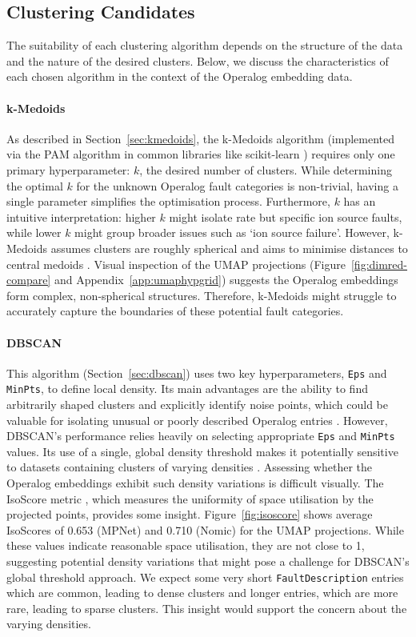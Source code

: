 \documentclass[10pt,oneside]{report}
\begin{document}
\subsection{Clustering Candidates}

The suitability of each clustering algorithm depends on the structure of the data and the nature of the desired clusters. Below, we discuss the characteristics of each chosen algorithm in the context of the Operalog embedding data.

\paragraph{k-Medoids} As described in Section~\ref{sec:kmedoids}, the k-Medoids algorithm (implemented via the PAM algorithm in common libraries like scikit-learn \cite{scikit-learn}) requires only one primary hyperparameter: $k$, the desired number of clusters. While determining the optimal $k$ for the unknown Operalog fault categories is non-trivial, having a single parameter simplifies the optimisation process. Furthermore, $k$ has an intuitive interpretation:  higher $k$ might isolate rate but specific ion source faults, while lower $k$ might group broader issues such as `ion source failure'. 
However, k-Medoids assumes clusters are roughly spherical and aims to minimise distances to central medoids \cite{kmedoids}. Visual inspection of the UMAP projections (Figure~\ref{fig:dimred-compare} and Appendix~\ref{app:umaphypgrid}) suggests the Operalog embeddings form complex, non-spherical structures. Therefore, k-Medoids might struggle to accurately capture the boundaries of these potential fault categories. 

\paragraph{DBSCAN} This algorithm (Section~\ref{sec:dbscan}) uses two key hyperparameters, \texttt{Eps} and \texttt{MinPts}, to define local density. Its main advantages are the ability to find arbitrarily shaped clusters and explicitly identify noise points, which could be valuable for isolating unusual or poorly described Operalog entries \cite{ester1996density}. However, DBSCAN's performance relies heavily on selecting appropriate \texttt{Eps} and \texttt{MinPts} values. Its use of a single, global density threshold makes it potentially sensitive to datasets containing clusters of varying densities \cite{campello2013density}. Assessing whether the Operalog embeddings exhibit such density variations is difficult visually. The IsoScore metric \cite{rudman2021isoscore}, which measures the uniformity of space utilisation by the projected points, provides some insight. Figure~\ref{fig:isoscore} shows average IsoScores of 0.653 (MPNet) and 0.710 (Nomic) for the UMAP projections. While these values indicate reasonable space utilisation, they are not close to 1, suggesting potential density variations that might pose a challenge for DBSCAN's global threshold approach. We expect some very short \texttt{FaultDescription} entries which are common, leading to dense clusters and longer entries, which are more rare, leading to sparse clusters. This insight would support the concern about the varying densities.
\end{document}
